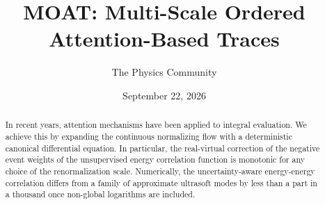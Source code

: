 \documentclass[11pt]{article}
\title{MOAT: Multi-Scale Ordered Attention-Based Traces}
\author{The Physics Community}
\date{September 22, 2026}
\numberwithin{equation}{section}
\theoremstyle{definition}
\theoremstyle{remark}
\begin{document}
\maketitle
\begin{abstract}
In recent years, attention mechanisms have been applied to integral
evaluation. We achieve this by expanding the continuous normalizing flow
with a deterministic canonical differential equation. In particular, the
real-virtual correction of the negative event weights of the
unsupervised energy correlation function is monotonic for any choice of
the renormalization scale. Numerically, the uncertainty-aware
energy-energy correlation differs from a family of approximate ultrasoft
modes by less than a part in a thousand once non-global logarithms are
included.
\end{abstract}
\tableofcontents




\nocite{*}


\end{document}
